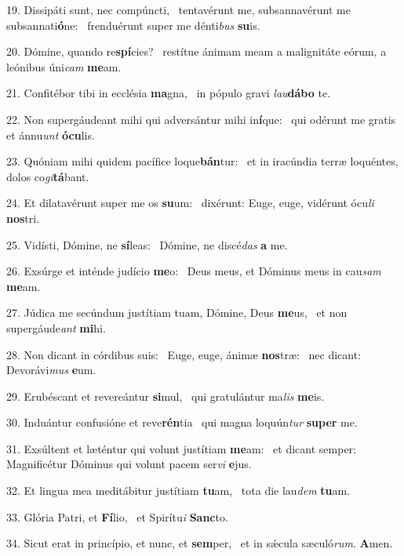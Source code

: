 19. Dissipáti sunt, nec compúncti, \dag\  tentavérunt me, subsannavérunt me subsannati\textbf{ó}ne: \ast\  frenduérunt super me dénti\textit{bus} \textbf{su}is.\

20. Dómine, quando re\textbf{spí}cies? \ast\  restítue ánimam meam a malignitáte eórum, a leónibus úni\textit{cam} \textbf{me}am.\

21. Confitébor tibi in ecclésia \textbf{ma}gna, \ast\  in pópulo gravi \textit{lau}\textbf{dá}\textbf{bo} te.\

22. Non supergáudeant mihi qui adversántur mihi in\textbf{í}que: \ast\  qui odérunt me gratis et ánnu\textit{unt} \textbf{ó}\textbf{cu}lis.\

23. Quóniam mihi quidem pacífice loque\textbf{bán}tur: \ast\  et in iracúndia terræ loquéntes, dolos co\textit{gi}\textbf{tá}bant.\

24. Et dilatavérunt super me os \textbf{su}um: \ast\  dixérunt: Euge, euge, vidérunt ócu\textit{li} \textbf{nos}tri.\

25. Vidísti, Dómine, ne \textbf{sí}leas: \ast\  Dómine, ne discé\textit{das} \textbf{a} me.\

26. Exsúrge et inténde judício \textbf{me}o: \ast\  Deus meus, et Dóminus meus in cau\textit{sam} \textbf{me}am.\

27. Júdica me secúndum justítiam tuam, Dómine, Deus \textbf{me}us, \ast\  et non supergáude\textit{ant} \textbf{mi}hi.\

28. Non dicant in córdibus suis: \dag\  Euge, euge, ánimæ \textbf{nos}træ: \ast\  nec dicant: Devorávi\textit{mus} \textbf{e}um.\

29. Erubéscant et revereántur \textbf{si}mul, \ast\  qui gratulántur ma\textit{lis} \textbf{me}is.\

30. Induántur confusióne et reve\textbf{rén}tia \ast\  qui magna loquún\textit{tur} \textbf{su}\textbf{per} me.\

31. Exsúltent et læténtur qui volunt justítiam \textbf{me}am: \ast\  et dicant semper: Magnificétur Dóminus qui volunt pacem ser\textit{vi} \textbf{e}jus.\

32. Et lingua mea meditábitur justítiam \textbf{tu}am, \ast\  tota die lau\textit{dem} \textbf{tu}am.\

33. Glória Patri, et \textbf{Fí}lio, \ast\  et Spirítu\textit{i} \textbf{Sanc}to.\

34. Sicut erat in princípio, et nunc, et \textbf{sem}per, \ast\  et in sǽcula sæculó\textit{rum}. \textbf{A}men.\

